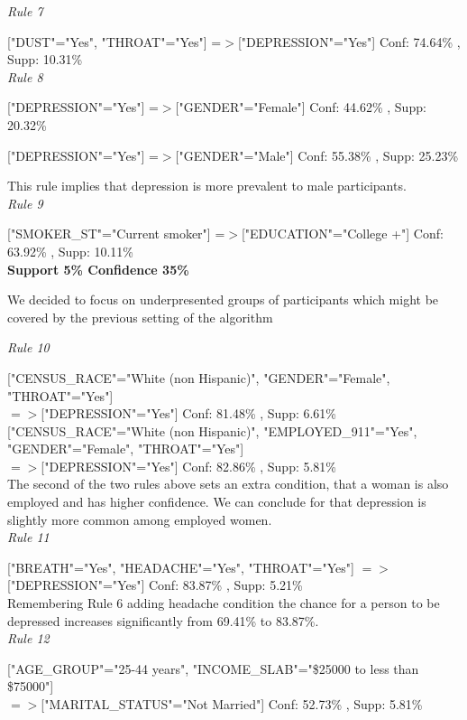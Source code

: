 \documentclass[11pt]{article}
\begin{document}
\textit{Rule 7}

["DUST"="Yes", "THROAT"="Yes"] =$>$["DEPRESSION"="Yes"] Conf: 74.64\% , Supp: 10.31\%  \\

\textit{Rule 8}

["DEPRESSION"="Yes"] =$>$["GENDER"="Female"] Conf: 44.62\% , Supp: 20.32\%  

["DEPRESSION"="Yes"] =$>$["GENDER"="Male"] Conf: 55.38\% , Supp: 25.23\% 

This rule implies that depression is more prevalent to male participants. \\

\textit{Rule 9}

["SMOKER\_ST"="Current smoker"] =$>$["EDUCATION"="College +"] Conf: 63.92\% , Supp: 10.11\%  \\

\textbf{Support 5\% Confidence 35\%}

We decided to focus on underpresented groups of participants which might be covered by the previous setting of the algorithm

\textit{Rule 10}

["CENSUS\_RACE"="White (non Hispanic)", "GENDER"="Female", "THROAT"="Yes"] \\
$=>$["DEPRESSION"="Yes"] Conf: 81.48\% , Supp: 6.61\%   \\

["CENSUS\_RACE"="White (non Hispanic)", "EMPLOYED\_911"="Yes", "GENDER"="Female", "THROAT"="Yes"]\\
 $=>$["DEPRESSION"="Yes"] Conf: 82.86\% , Supp: 5.81\%  \\

The second of the two rules above sets an extra condition, that a woman is also employed and has higher confidence. We can conclude for that depression
is slightly more common among employed women. \\

\textit{Rule 11}

["BREATH"="Yes", "HEADACHE"="Yes", "THROAT"="Yes"] $=>$ ["DEPRESSION"="Yes"] Conf: 83.87\% , Supp: 5.21\%  \\

Remembering Rule 6 adding headache condition the chance for a person to be depressed increases significantly from 69.41\% to 83.87\%. \\

\textit{Rule 12}

["AGE\_GROUP"="25-44 years", "INCOME\_SLAB"="\$25000 to less than \$75000"] \\
$=>$["MARITAL\_STATUS"="Not Married"] Conf: 52.73\% , Supp: 5.81\% 
\end{document}
